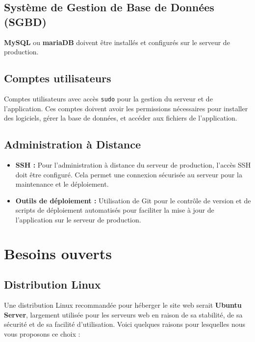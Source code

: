 \subsection{Système de Gestion de Base de Données (SGBD)}

\textbf{MySQL} ou \textbf{mariaDB} doivent être installés et configurés sur le serveur de production.

\subsection{Comptes utilisateurs}

Comptes utilisateurs avec accès \texttt{sudo} pour la gestion du serveur et de l'application. Ces comptes doivent avoir les permissions nécessaires pour installer des logiciels, gérer la base de données, et accéder aux fichiers de l'application.

\subsection{Administration à Distance}

\begin{itemize}
	\item \textbf{SSH :} Pour l'administration à distance du serveur de production, l'accès SSH doit être configuré. Cela permet une connexion sécurisée au serveur pour la maintenance et le déploiement.
	\item \textbf{Outils de déploiement :} Utilisation de Git pour le contrôle de version et de scripts de déploiement automatisés pour faciliter la mise à jour de l'application sur le serveur de production.
\end{itemize}

\section{Besoins ouverts}

\subsection{Distribution Linux}

Une distribution Linux recommandée pour héberger le site web serait \textbf{Ubuntu Server}, largement utilisée pour les serveurs web en raison de sa stabilité, de sa sécurité et de sa facilité d'utilisation. Voici quelques raisons pour lesquelles nous vous proposons ce choix :

